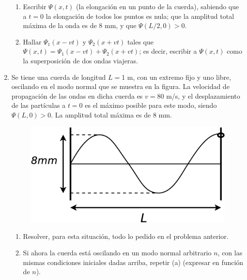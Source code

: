 \documentclass[11pt,spanish]{article}
\begin{document}
\begin{enumerate}
    \begin{enumerate}
    \item Escribir $\Psi(x,t)$ (la elongación en un punto de la cuerda),
    sabiendo que a $t=0$ la elongación de todos los puntos es nula; que la
    amplitud total máxima de la onda es de 8 mm, y que $\dot{\Psi}(L/2,0) > 0$.

    \item Hallar $\Psi_{1}(x-vt)$ y $\Psi_{2}(x+vt)$ tales que
    $\Psi(x,t)=\Psi_{1}(x-vt)+\Psi_{2}(x+vt)$; es decir, escribir a $\Psi(x,t)$
    como la superposición de dos ondas viajeras.
\end{enumerate}


    \item Se tiene una cuerda de longitud $L=$1 m, con un extremo fijo y uno
    libre, oscilando en el modo normal que se muestra en la figura. La
    velocidad de propagación de las ondas en dicha cuerda es $v=80$ m/s, y el
    desplazamiento de las partículas a $t=0$ es el máximo posible para este
    modo, siendo $\Psi(L,0)>0$. La amplitud total máxima es de 8 mm.

    \begin{figure}[H]
        \centering{}\includegraphics[clip,scale=0.25]{figs/ej1-33}
    \end{figure}

    \begin{enumerate}
        \item Resolver, para esta situación, todo lo pedido en el problema
        anterior. 

        \item Si ahora la cuerda está oscilando en un modo normal arbitrario
        $n$, con las mismas condiciones iniciales dadas arriba, repetir (a)
        (expresar en función de $n$).
    \end{enumerate}


\end{enumerate}
\end{document}
